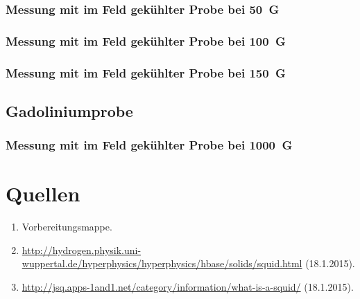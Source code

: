 \documentclass[a4paper,ngerman]{scrartcl}
\begin{document}
\subsubsection*{Messung mit im Feld gekühlter Probe bei \SI{50}{G}}

\subsubsection*{Messung mit im Feld gekühlter Probe bei \SI{100}{G}}

\subsubsection*{Messung mit im Feld gekühlter Probe bei \SI{150}{G}}



\subsection{Gadoliniumprobe}

\subsubsection*{Messung mit im Feld gekühlter Probe bei \SI{1000}{G}}



\section{Quellen}
\begin{enumerate}
\item Vorbereitungsmappe.\label{ref:mappe}
\item \url{http://hydrogen.physik.uni-wuppertal.de/hyperphysics/hyperphysics/hbase/solids/squid.html} (18.1.2015).\label{ref:wuppertal}
\item \url{http://jsq.apps-1and1.net/category/information/what-is-a-squid/} (18.1.2015).
\label{ref:jsq}
\end{enumerate}
\end{document}
